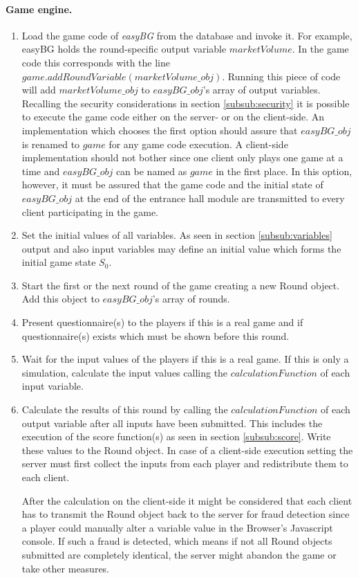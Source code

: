 \paragraph{Game engine.} 
\begin{enumerate}
\item Load the game code of \textit{easyBG} from the database and invoke it. For example, easyBG holds the round-specific output variable $marketVolume$. In the game code this corresponds with the line $game.addRoundVariable(marketVolume\_obj)$. Running this piece of code will add $marketVolume\_obj$ to $easyBG\_obj$'s array of output variables. Recalling the security considerations in section \ref{subsub:security} it is possible to execute the game code either on the server- or on the client-side. An implementation which chooses the first option should assure that $easyBG\_obj$ is renamed to $game$ for any game code execution. A client-side implementation should not bother since one client only plays one game at a time and $easyBG\_obj$ can be named as $game$ in the first place. In this option, however, it must be assured that the game code and the initial state of $easyBG\_obj$ at the end of the entrance hall module are transmitted to every client participating in the game.
\item Set the initial values of all variables. As seen in section \ref{subsub:variables} output and also input variables may define an initial value which forms the initial game state $S_0$. 
\item Start the first or the next round of the game creating a new Round object. Add this object to $easyBG\_obj$'s array of rounds.
\item Present questionnaire(s) to the players if this is a real game and if questionnaire(s) exists which must be shown before this round.
\item Wait for the input values of the players if this is a real game. If this is only a simulation, calculate the input values calling the $calculationFunction$ of each input variable.
\item Calculate the results of this round by calling the $calculationFunction$ of each output variable after all inputs have been submitted. This includes the execution of the score function(s) as seen in section \ref{subsub:score}. Write these values to the Round object. In case of a client-side execution setting the server must first collect the inputs from each player and redistribute them to each client. 

After the calculation on the client-side it might be considered that each client has to transmit the Round object back to the server for fraud detection since a player could manually alter a variable value in the Browser's Javascript console. If such a fraud is detected, which means if not all Round objects submitted are completely identical, the server might abandon the game or take other measures.


\end{enumerate}
